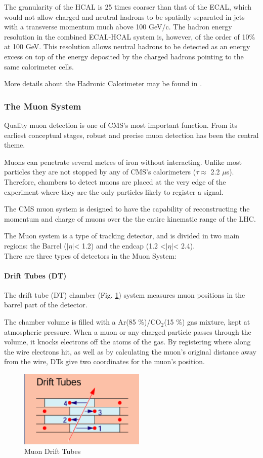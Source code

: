 The granularity of the HCAL is 25 times coarser than that of
the ECAL, which would not allow charged and neutral hadrons to be spatially separated in jets with a transverse momentum much above 100 GeV/c. The hadron energy resolution in the combined ECAL-HCAL system is, however, of the order of 10$\%$ at 100 GeV. This resolution allows neutral hadrons to be detected as an energy excess on top of the energy deposited by the charged hadrons pointing to the same calorimeter cells.

More details about the Hadronic Calorimeter may be found in \cite{HCAL2, HCAL3, HCAL4, HCAL5}.

\subsubsection{The Muon System}
\noindent Quality muon detection is one of CMS's most important function. From its earliest conceptual stages, robust and precise muon detection has been the central theme.

Muons can penetrate several metres of iron without interacting. Unlike most particles they are not stopped by any of CMS's calorimeters ($\tau \approx$ 2.2 $\mu$s). Therefore, chambers to detect muons are placed at the very edge of the experiment where they are the only particles likely to register a signal. 

\noindent
The CMS muon system is designed to have the capability of reconstructing the momentum and charge of muons over the the entire kinematic range of the LHC. 

\noindent
The Muon system is a type of tracking detector, and is divided in two main regions: the Barrel ($|\eta|$< 1.2) and  the endcap (1.2 <$|\eta|$< 2.4).\\
There are three types of detectors in the Muon System:

\paragraph{Drift Tubes (DT)}
The drift tube (DT) chamber (Fig. \ref{fig:DT}) system measures muon positions in the barrel part of the detector.

The chamber volume is filled with a Ar(85 $\%$)/CO$_{2}$(15 $\%$) gas mixture, kept at atmospheric pressure.  When a muon or any charged particle passes through the volume, it knocks electrons off the atoms of the gas. By registering where along the wire electrons hit, as well as by calculating the muon's original distance away from the wire, DTs give two coordinates for the muon’s position.
\begin{figure}[H]
  \centering
\includegraphics[width=6cm]{CMS_chapter_plots/DT}
  \caption{Muon Drift Tubes \label{fig:DT}}
\end{figure}
